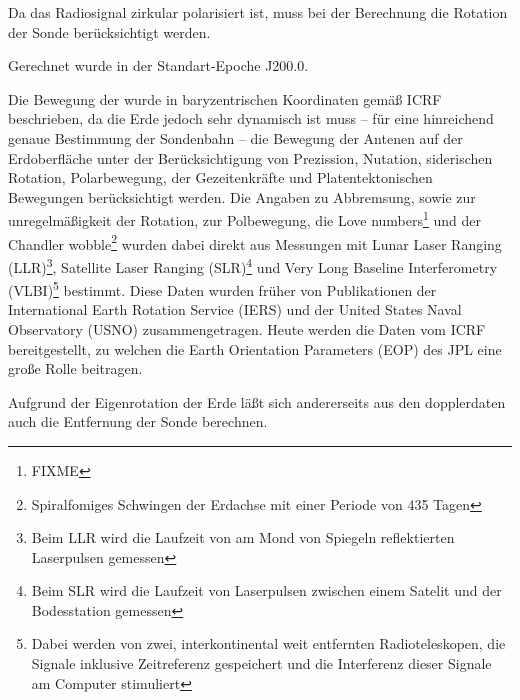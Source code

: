 Da das Radiosignal zirkular polarisiert ist, muss bei der Berechnung die Rotation der Sonde berücksichtigt werden. %

Gerechnet wurde in der Standart-Epoche J200.0. %

Die Bewegung der wurde in baryzentrischen Koordinaten gemäß ICRF beschrieben, %
da die Erde jedoch sehr dynamisch ist muss – für eine hinreichend genaue Bestimmung der Sondenbahn –
die Bewegung der Antenen auf der Erdoberfläche unter der Berücksichtigung von Prezission, Nutation,
siderischen Rotation, Polarbewegung, der Gezeitenkräfte und Platentektonischen Bewegungen berücksichtigt werden.
Die Angaben zu Abbremsung, sowie zur unregelmäßigkeit der Rotation, zur Polbewegung, die Love numbers\footnote{FIXME} und der Chandler wobble\footnote{Spiralfomiges Schwingen der Erdachse mit einer Periode von 435 Tagen} %
wurden dabei direkt aus Messungen mit Lunar Laser Ranging (LLR)\footnote{Beim LLR wird die Laufzeit von am Mond von Spiegeln reflektierten Laserpulsen gemessen}, Satellite Laser Ranging (SLR)\footnote{Beim SLR wird die Laufzeit von Laserpulsen zwischen einem Satelit und der Bodesstation gemessen} und Very Long Baseline Interferometry (VLBI)\footnote{Dabei werden von zwei, interkontinental weit entfernten Radioteleskopen, die Signale inklusive Zeitreferenz gespeichert und die Interferenz dieser Signale am Computer stimuliert} bestimmt.
Diese Daten wurden früher von Publikationen der International Earth Rotation Service (IERS) und der United States Naval Observatory (USNO) zusammengetragen. Heute werden die Daten vom ICRF bereitgestellt, zu welchen die Earth Orientation Parameters
(EOP) des JPL eine große Rolle beitragen.

Aufgrund der Eigenrotation der Erde läßt sich andererseits aus den dopplerdaten auch die %
Entfernung der Sonde berechnen. %



